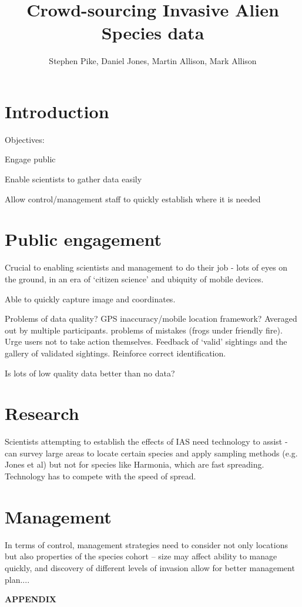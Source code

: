 \documentclass[12pt]{article}
\begin{document}
\author{Stephen Pike, Daniel Jones, Martin Allison, Mark Allison}
\title{Crowd-sourcing Invasive Alien Species data}

\maketitle
\begin{abstract}


\end{abstract}

\clearpage

\tableofcontents
\listoffigures
\clearpage

\section{Introduction}

Objectives:

Engage public

Enable scientists to gather data easily

Allow control/management staff to quickly establish where it is needed

\section{Public engagement}
Crucial to enabling scientists and management to do their job - lots of eyes on the ground, in an era of `citizen science' and ubiquity of mobile devices.

Able to quickly capture image and coordinates. 

Problems of data quality? GPS inaccuracy/mobile location framework? Averaged out by multiple participants.
problems of mistakes (frogs under friendly fire). Urge users not to take action themselves. Feedback of `valid' sightings and the gallery of validated sightings. Reinforce correct identification.

Is lots of low quality data better than no data?

\section{Research}

Scientists attempting to establish the effects of IAS need technology to assist - can survey large areas to locate certain species and apply sampling methods (e.g. Jones et al) but not for species like Harmonia, which are fast spreading. Technology has to compete with the speed of spread.

\section{Management}

In terms of control, management strategies need to consider not only locations but also properties of the species cohort -- size may affect ability to manage quickly, and discovery of different levels of invasion allow for better management plan....





\clearpage
\appendix
\begin{center}
    {\bf APPENDIX}
\end{center}
\end{document}
